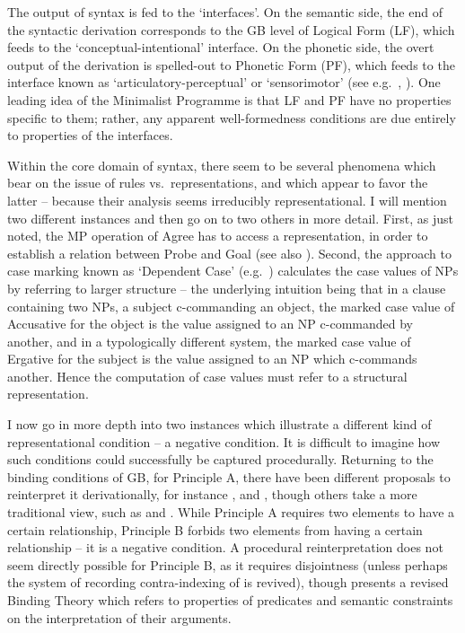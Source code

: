 \documentclass[output=paper,hidelinks]{langscibook}
\begin{document}
The output of syntax is fed to the `interfaces'. On the semantic
side, the end of the syntactic derivation corresponds to the GB level
of Logical Form (LF), which feeds to the `conceptual-intentional'
interface. On the phonetic side, the overt output of the derivation is
spelled-out to Phonetic Form (PF), which feeds to the interface
known as `articulatory-perceptual' or `sensorimotor' (see
e.g.~\citealp[2]{chomsky1995the-minimalist},
\citealp[5]{chomsky07}). One leading idea of the Minimalist Programme
is that LF and PF have no properties specific to them; rather, any
apparent well-formedness conditions are due entirely to properties of
the interfaces.

Within the core domain of syntax, there seem to be several phenomena
which bear on the issue of rules vs.~representations, and which appear
to favor the latter -- because their analysis seems irreducibly
representational. I will mention two different instances and then go
on to two others in more detail. First, as just noted, the MP
operation of Agree has to access a representation, in order to
establish a relation between Probe and Goal (see also
). Second, the approach to case marking
known as `Dependent Case' (e.g.~\citealp{baker15}) calculates the case
values of NPs by referring to larger structure -- the underlying
intuition being that in a clause containing two NPs, a subject
c-commanding an object, the marked case value of Accusative for the
object is the value assigned to an NP c-commanded by another, and in a
typologically different system, the marked case value of Ergative for
the subject is the value assigned to an NP which c-commands
another. Hence the computation of case values must refer to a
structural representation.

I now go in more depth into two instances which illustrate a different
kind of representational condition -- a negative condition. It is
difficult to imagine how such conditions could successfully be
captured procedurally. Returning to the binding conditions of GB, for
Principle A, there have been different proposals to reinterpret it
derivationally, for instance \citet{lidzidsardi98},
\citet{hornstein01} and \citet{boeckx07}, though others take a more
traditional view, such as \citet{safir08} and
\citet{charnavelsportiche16}. While Principle A requires two elements
to have a certain relationship, Principle B forbids two elements from
having a certain relationship -- it is a negative condition. A
procedural reinterpretation does not seem directly possible for
Principle B, as it requires disjointness (unless perhaps the system of
recording contra-indexing of \citealp{chomsky80} is revived), though
\citet{reuland11} presents a revised Binding Theory which refers to
properties of predicates and semantic constraints on the
interpretation of their arguments.
\end{document}
